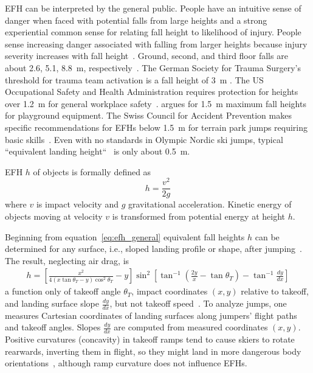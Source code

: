 \documentclass[fleqn,10pt,lineno]{wlpeerj}
\begin{document}
EFH can be interpreted by the general public. People have an intuitive sense of
danger when faced with potential falls from large heights and a strong
experiential common sense for relating fall height to likelihood of injury.
People sense increasing danger associated with falling from larger heights
because injury severity increases with fall height~\citep{Nau2021}.  Ground,
second, and third floor falls are about 2.6, 5.1, 8.8~\si{\meter},
respectively~\citep{Vish2005}. The German Society for Trauma Surgery's
threshold for trauma team activation is a fall height of 3~\si{\meter}
\citep{PolytraumaGuidelineUpdateGroup2018}. The US Occupational Safety and
Health Administration requires protection for heights over 1.2~\si{\meter} for
general workplace safety~\citep{OSHA2021}. \cite{Chalmers1996} argues for
1.5~\si{\meter} maximum fall heights for playground equipment. The Swiss
Council for Accident Prevention makes specific recommendations for EFHs below
1.5~\si{\meter} for terrain park jumps requiring basic skills~\citep{Heer2019}.
Even with no standards in Olympic Nordic ski jumps, typical ``equivalent
landing height``~\citep{Gasser2018} is only about 0.5~\si{\meter}.

EFH $h$ of objects is formally defined as
%
\begin{equation}
  h = \frac{v^2}{2g}
  \label{eq:efh_general}
\end{equation}
%
where $v$ is impact velocity and $g$ gravitational acceleration.  Kinetic
energy of objects moving at  velocity $v$  is transformed from potential energy
at height $h$.

Beginning from equation~\ref{eq:efh_general} equivalent fall heights $h$ can be
determined for any surface, i.e., sloped landing profile or shape, after
jumping~\citep{Petrone2017}. The result, neglecting air drag, is
%
\begin{align}
  h = \left[\frac{x^2}{4(x\tan\theta_T - y)\cos^{2}\theta_T} - y\right]
    \sin^{2}
    \left[\tan^{-1}\left(\frac{2y}{x} - \tan\theta_T\right) -
    \tan^{-1}\frac{dy}{dx}\right]
  \label{eq:efh}
\end{align}
%
a function only of takeoff angle $\theta_T$, impact coordinates $(x,y)$
relative to takeoff, and landing surface slope $\frac{dy}{dx}$, but not takeoff
speed~\citep{Petrone2017}. To analyze jumps, one measures Cartesian coordinates
of landing surfaces along jumpers' flight paths and takeoff angles. Slopes
$\frac{dy}{dx}$ are computed from measured coordinates $(x,y)$. Positive
curvatures (concavity) in takeoff ramps tend to cause skiers to rotate
rearwards, inverting them in flight, so they might land in more dangerous body
orientations~\citep{Scher2015}, although ramp curvature does not influence
EFHs.
\end{document}
